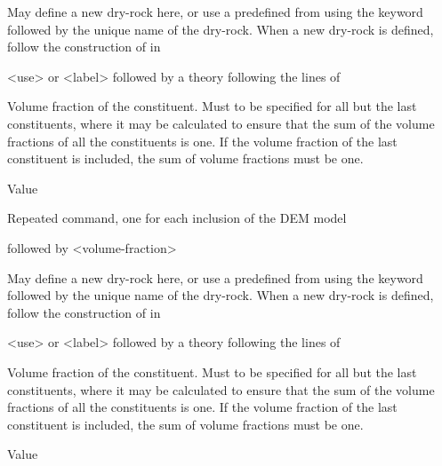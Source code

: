 {
 \slist
   \item \Description  May define a new dry-rock here, or use a predefined  from  using the keyword  followed by the unique name of the dry-rock. When a new dry-rock is defined, follow the construction of  in 
   \item \Argument <use> or <label> followed by a theory following the lines of 
   \item \Default
 \elist

 \slist
   \item \Description Volume fraction of the constituent. Must to be specified for all but the last constituents, where it may be calculated to ensure that the sum of the volume fractions of all the constituents is one. If the volume fraction of the last constituent is included, the sum of volume fractions must be one. 
   \item \Argument Value
   \item \Default
 \elist

 \slist
   \item \Description Repeated command, one for each inclusion of the DEM model
   \item {} followed by <volume-fraction>
   \item \Default
 \elist

 \slist
   \item \Description  May define a new dry-rock here, or use a predefined  from  using the keyword  followed by the unique name of the dry-rock. When a new dry-rock is defined, follow the construction of  in 
   \item \Argument <use> or <label> followed by a theory following the lines of 
   \item \Default
 \elist

 \slist
   \item \Description Volume fraction of the constituent. Must to be specified for all but the last constituents, where it may be calculated to ensure that the sum of the volume fractions of all the constituents is one. If the volume fraction of the last constituent is included, the sum of volume fractions must be one. 
   \item \Argument Value
   \item \Default
 \elist

}
